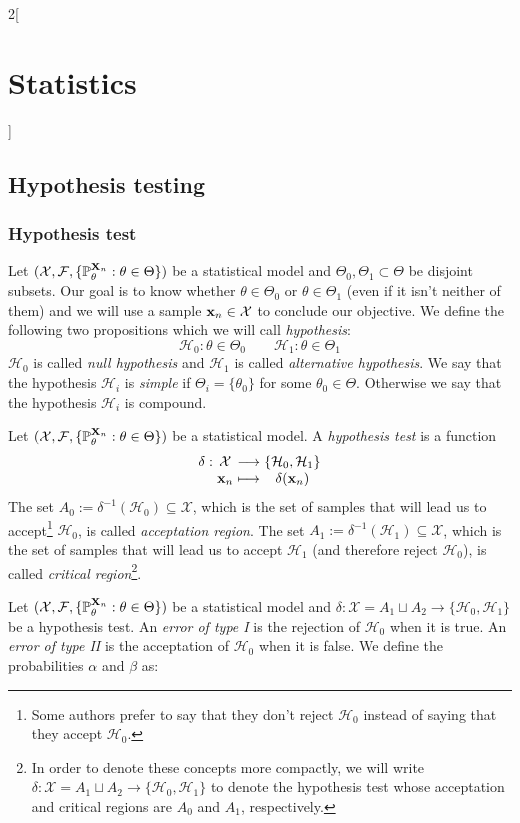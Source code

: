 \documentclass[../../../main.tex]{subfiles}
\begin{document}
\begin{multicols}{2}[\section{Statistics}]
  \subsection{Hypothesis testing}
  \subsubsection{Hypothesis test}
  \begin{definition}
    Let $(\mathcal{X},\mathcal{F},\{\mathbb{P}_\theta^{\boldsymbol{\mathrm{X}}_n}:\theta\in\Theta\})$ be a statistical model and $\Theta_0,\Theta_1\subset\Theta$ be disjoint subsets. Our goal is to know whether $\theta\in\Theta_0$ or $\theta\in\Theta_1$ (even if it isn't neither of them) and we will use a sample $\boldsymbol{\mathrm{x}}_n\in\mathcal{X}$ to conclude our objective. We define the following two propositions which we will call \emph{hypothesis}:
    $$\mathcal{H}_0:\theta\in\Theta_0\qquad\mathcal{H}_1:\theta\in\Theta_1$$
    $\mathcal{H}_0$ is called \emph{null hypothesis} and $\mathcal{H}_1$ is called \emph{alternative hypothesis}. We say that the hypothesis $\mathcal{H}_i$ is \emph{simple} if $\Theta_i=\{\theta_0\}$ for some $\theta_0\in\Theta$. Otherwise we say that the hypothesis $\mathcal{H}_i$ is compound.
  \end{definition}
  \begin{definition}
    Let $(\mathcal{X},\mathcal{F},\{\mathbb{P}_\theta^{\boldsymbol{\mathrm{X}}_n}:\theta\in\Theta\})$ be a statistical model. A \emph{hypothesis test} is a function $$\function{\delta}{\mathcal{X}}{\{\mathcal{H}_0,\mathcal{H}_1\}}{\vf{x}_n}{\delta(\vf{x}_n)}$$
    The set $A_0:=\delta^{-1}(\mathcal{H}_0)\subseteq \mathcal{X}$, which is the set of samples that will lead us to accept\footnote{Some authors prefer to say that they don't reject $\mathcal{H}_0$ instead of saying that they accept $\mathcal{H}_0$.} $\mathcal{H}_0$, is called \emph{acceptation region}. The set $A_1:=\delta^{-1}(\mathcal{H}_1)\subseteq \mathcal{X}$, which is the set of samples that will lead us to accept $\mathcal{H}_1$ (and therefore reject $\mathcal{H}_0$), is called \emph{critical region}\footnote{In order to denote these concepts more compactly, we will write $\delta:\mathcal{X}=A_1\sqcup A_2\rightarrow\{\mathcal{H}_0,\mathcal{H}_1\}$ to denote the hypothesis test whose acceptation and critical regions are $A_0$ and $A_1$, respectively.}.
  \end{definition}
  \begin{definition}
    Let $(\mathcal{X},\mathcal{F},\{\mathbb{P}_\theta^{\boldsymbol{\mathrm{X}}_n}:\theta\in\Theta\})$ be a statistical model and $\delta:\mathcal{X}=A_1\sqcup A_2\rightarrow\{\mathcal{H}_0,\mathcal{H}_1\}$ be a hypothesis test. An \emph{error of type I} is the rejection of $\mathcal{H}_0$ when it is true. An \emph{error of type II} is the acceptation of $\mathcal{H}_0$ when it is false. We define the probabilities $\alpha$ and $\beta$ as:

\end{definition}
\end{multicols}
\end{document}
